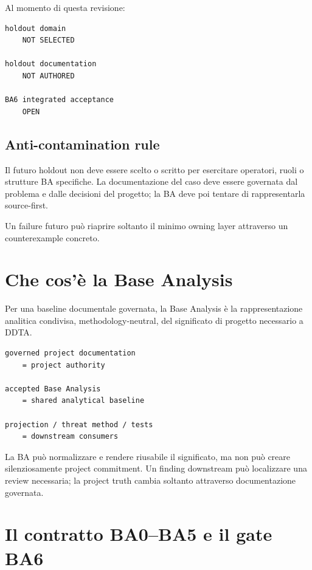 \documentclass[11pt,a4paper]{article}
\begin{document}
Al momento di questa revisione:

\begin{lstlisting}
holdout domain
    NOT SELECTED

holdout documentation
    NOT AUTHORED

BA6 integrated acceptance
    OPEN
\end{lstlisting}

\subsection{Anti-contamination rule}

Il futuro holdout non deve essere scelto o scritto per esercitare operatori, ruoli o strutture BA specifiche. La documentazione del caso deve essere governata dal problema e dalle decisioni del progetto; la BA deve poi tentare di rappresentarla source-first.

Un failure futuro può riaprire soltanto il minimo owning layer attraverso un counterexample concreto.

\section{Che cos'è la Base Analysis}

Per una baseline documentale governata, la Base Analysis è la rappresentazione analitica condivisa, methodology-neutral, del significato di progetto necessario a DDTA.

\begin{closedbox}
\begin{lstlisting}
governed project documentation
    = project authority

accepted Base Analysis
    = shared analytical baseline

projection / threat method / tests
    = downstream consumers
\end{lstlisting}
\end{closedbox}

La BA può normalizzare e rendere riusabile il significato, ma non può creare silenziosamente project commitment. Un finding downstream può localizzare una review necessaria; la project truth cambia soltanto attraverso documentazione governata.

\section{Il contratto BA0--BA5 e il gate BA6}
\end{document}
